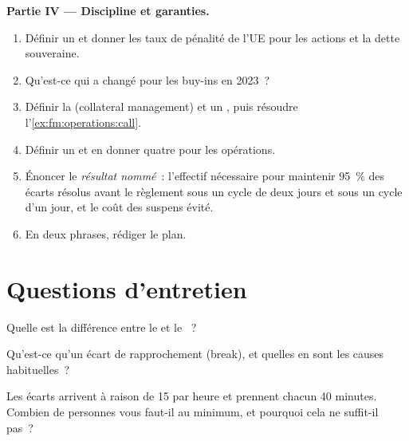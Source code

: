 \begin{problem}
\medskip\noindent\textbf{Partie IV --- Discipline et garanties.}
\begin{enumerate}[resume]
\item Définir un  et donner les taux de pénalité de l'UE pour les actions et la dette souveraine.
\item Qu'est-ce qui a changé pour les buy-ins en 2023~?
\item Définir la  (collateral management) et un , puis résoudre l'\cref{ex:fm:operations:call}.
\item Définir un  et en donner quatre pour les opérations.
\item Énoncer le \emph{résultat nommé}~: l'effectif nécessaire pour maintenir 95~\% des écarts résolus avant le règlement sous un cycle de deux jours et sous un cycle d'un jour, et
le coût des suspens évité.
\item En deux phrases, rédiger le plan.
\end{enumerate}
\end{problem}

\section{Questions d'entretien}

\begin{interviewq}\label{iq:fm:operations:1}
Quelle est la différence entre le  et le ~?
\end{interviewq}

\begin{interviewq}\label{iq:fm:operations:2}
Qu'est-ce qu'un écart de rapprochement (break), et quelles en sont les causes habituelles~?
\end{interviewq}

\begin{interviewq}\label{iq:fm:operations:3}
Les écarts arrivent à raison de 15 par heure et prennent chacun 40 minutes. Combien de personnes vous faut-il au minimum, et pourquoi cela ne suffit-il pas~?
\end{interviewq}

